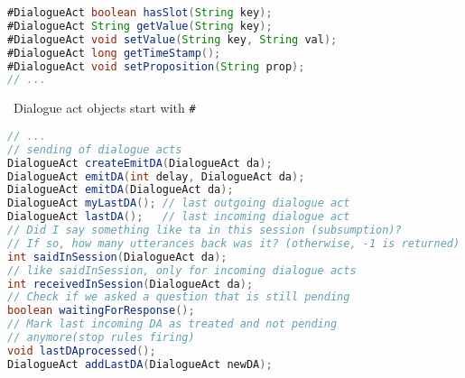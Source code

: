 \documentclass[5pt]{article}
\newcommand{\intitle}[1]{\rule{0pt}{2ex}\ #1}
\begin{document}
\begin{multicols}{2}
\begin{bodybox}{}
\begin{lstlisting}[language=Java]
#DialogueAct boolean hasSlot(String key);
#DialogueAct String getValue(String key);
#DialogueAct void setValue(String key, String val);
#DialogueAct long getTimeStamp();
#DialogueAct void setProposition(String prop);
// ...
        \end{lstlisting}
        \intitle{Dialogue act objects start with \texttt{\#}}
        \begin{lstlisting}[language=Java]
// ...
// sending of dialogue acts
DialogueAct createEmitDA(DialogueAct da);
DialogueAct emitDA(int delay, DialogueAct da);
DialogueAct emitDA(DialogueAct da);
DialogueAct myLastDA(); // last outgoing dialogue act
DialogueAct lastDA();   // last incoming dialogue act
// Did I say something like ta in this session (subsumption)?
// If so, how many utterances back was it? (otherwise, -1 is returned)
int saidInSession(DialogueAct da);
// like saidInSession, only for incoming dialogue acts
int receivedInSession(DialogueAct da);
// Check if we asked a question that is still pending
boolean waitingForResponse();
// Mark last incoming DA as treated and not pending
// anymore(stop rules firing)
void lastDAprocessed();
DialogueAct addLastDA(DialogueAct newDA);
        \end{lstlisting}
        \end{bodybox}
    \end{multicols}
\end{document}
